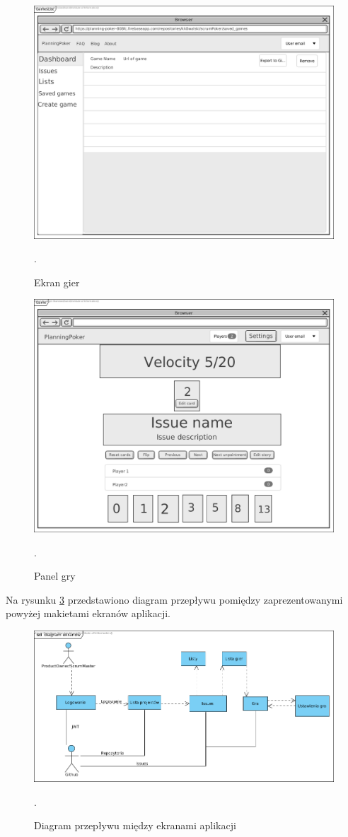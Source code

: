 \begin{figure}[H]
	\centering\includegraphics[width=.7\textwidth]{img/GamesList}
	\caption{Ekran gier}.
	\label{rys:GamesList}
\end{figure}

\begin{figure}[H]
	\centering\includegraphics[width=.7\textwidth]{img/GameScreen}
	\caption{Panel gry}.
	\label{rys:GameScreen}
\end{figure}

Na rysunku \ref{rys:ScreensDiagram} przedstawiono diagram przepływu pomiędzy
zaprezentowanymi powyżej makietami ekranów aplikacji.

\begin{figure}[H]
	\centering\includegraphics[width=\textwidth]{img/ScreensDiagram}
	\caption{Diagram przepływu między ekranami aplikacji}.
	\label{rys:ScreensDiagram}
\end{figure}

